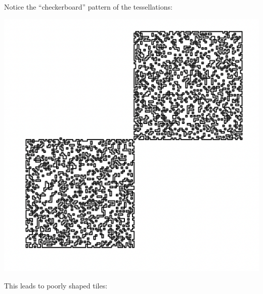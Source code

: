 \documentclass[
]{book}
\newenvironment{Shaded}{\begin{snugshade}}{\end{snugshade}}
\newcommand{\DecValTok}[1]{\textcolor[rgb]{0.00,0.00,0.81}{#1}}
\newcommand{\FunctionTok}[1]{\textcolor[rgb]{0.00,0.00,0.00}{#1}}
\newcommand{\NormalTok}[1]{#1}
\newcommand{\SpecialCharTok}[1]{\textcolor[rgb]{0.00,0.00,0.00}{#1}}
\begin{document}
Notice the ``checkerboard'' pattern of the tessellations:

\begin{Shaded}
\end{Shaded}

\includegraphics[width=7.47in]{Figures/Package Figs/bad_window}

This leads to poorly shaped tiles:

\begin{Shaded}
\end{Shaded}
\end{document}
